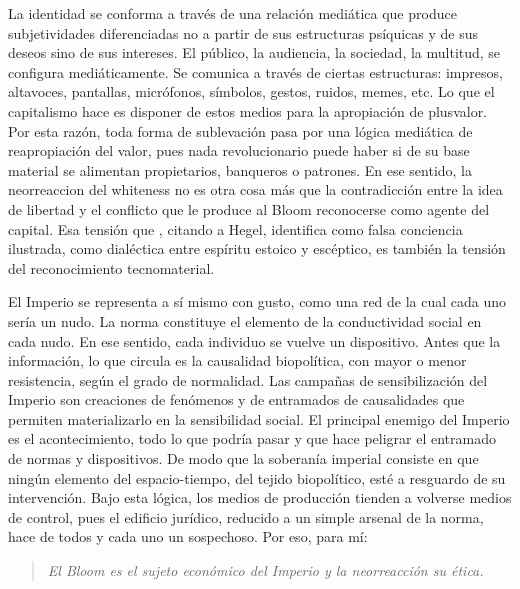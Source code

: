 La identidad se conforma a través de una relación mediática que produce subjetividades diferenciadas no a partir de sus estructuras psíquicas y de sus deseos sino de sus intereses. El público, la audiencia, la sociedad, la multitud, se configura mediáticamente. Se comunica a través de ciertas estructuras: impresos, altavoces, pantallas, micrófonos, símbolos, gestos, ruidos, memes, etc. Lo que el capitalismo hace es disponer de estos medios para la apropiación de plusvalor. Por esta razón, toda forma de sublevación pasa por una lógica mediática de reapropiación del valor, pues nada revolucionario puede haber si de su base material se alimentan propietarios, banqueros o patrones. En ese sentido, la neorreaccion del whiteness no es otra cosa más que la contradicción entre la idea de libertad y el conflicto que le produce al Bloom reconocerse como agente del capital. Esa tensión que \autocite{huiUnhappyConsciousnessNeoreactionaries2017}, citando a Hegel, identifica como falsa conciencia ilustrada, como dialéctica entre espíritu estoico y escéptico, es también la tensión del reconocimiento tecnomaterial.

El Imperio se representa a sí mismo con gusto, como una red de la cual cada uno sería un nudo. La norma constituye el elemento de la conductividad social en cada nudo. En ese sentido, cada individuo se vuelve un dispositivo. Antes que la información, lo que circula es la causalidad biopolítica, con mayor o menor resistencia, según el grado de normalidad. Las campañas de sensibilización del Imperio son creaciones de fenómenos y de entramados de causalidades que permiten materializarlo en la sensibilidad social. El principal enemigo del Imperio es el acontecimiento, todo lo que podría pasar y que hace peligrar el entramado de normas y dispositivos. De modo que la soberanía imperial consiste en que ningún elemento del espacio-tiempo, del tejido biopolítico, esté a resguardo de su intervención. Bajo esta lógica, los medios de producción tienden a volverse medios de control, pues el edificio jurídico, reducido a un simple arsenal de la norma, hace de todos y cada uno un sospechoso. Por eso, para mí:

\begin{quote}
  \emph{El Bloom es el sujeto económico del Imperio y la neorreacción su ética.}
\end{quote}

